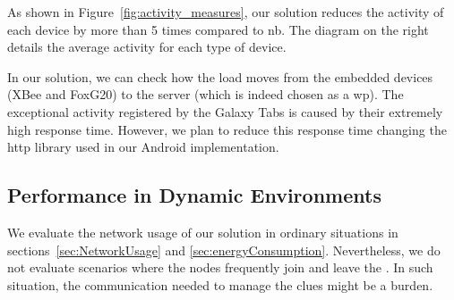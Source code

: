 As shown in Figure~\ref{fig:activity_measures}, our solution reduces the activity of each device by more than 5 times compared to \acl{nb}.
The diagram on the right details the average activity for each type of device.

In our solution, we can check how the load moves from the embedded devices (XBee and FoxG20) to the server (which is indeed chosen as a \ac{wp}).
The exceptional activity registered by the Galaxy Tabs is caused by their extremely high response time.
However, we plan to reduce this response time changing the \acs{http} library used in our Android implementation.



%



\subsection{Performance in Dynamic Environments}
\label{sec:dynamic}
We evaluate the network usage of our solution in ordinary situations in sections~\ref{sec:NetworkUsage} and \ref{sec:energyConsumption}.
Nevertheless, we do not evaluate scenarios where the nodes frequently join and leave the \Space{}.
In such situation, the communication needed to manage the clues might be a burden.


